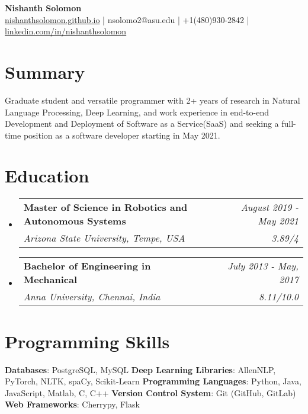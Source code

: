 \documentclass[letterpaper,11pt]{article}
\makeatletter
\newcommand{\resumeSubheading}[4]{
  \vspace{-1pt}\item
    \begin{tabular*}{0.97\textwidth}[t]{l@{\extracolsep{\fill}}r}
      \textbf{#1} & #2 \\
      \textit{\small#3} & \textit{\small #4} \\
    \end{tabular*}\vspace{-5pt}
}
\newcommand{\resumeSubHeadingListStart}{\begin{itemize}[leftmargin=*]}
\newcommand{\resumeSubHeadingListEnd}{\end{itemize}}
\makeatother
\begin{document}
\begin{center}{\textwidth}{{\extracolsep{\fill}}}
  \textbf{{\huge Nishanth Solomon}}\\
  \href{nishanthsolomon.github.io}{nishanthsolomon.github.io} | {nsolomo2@asu.edu} | {+1(480)930-2842} | \href{https://linkedin.com/in/nishanthsolomon/}{linkedin.com/in/nishanthsolomon}
\end{center}




\section{Summary}
{Graduate student and versatile programmer with 2+ years of research in Natural Language Processing, Deep Learning, and work experience in end-to-end Development and Deployment of Software as a Service(SaaS) and seeking a full-time position as a software developer starting in May 2021.}
\section{Education}
  \resumeSubHeadingListStart
    \resumeSubheading
      {Master of Science in Robotics and Autonomous Systems}{\textit{August 2019 - May 2021}}
      {Arizona State University, Tempe, USA}{3.89/4}
    \resumeSubheading
      {Bachelor of Engineering in Mechanical}{\textit{July 2013 - May, 2017}}
      {Anna University, Chennai, India}{8.11/10.0}
  \resumeSubHeadingListEnd

\section{Programming Skills}
 \resumeSubHeadingListStart
   {
     \textbf{Databases}{: PostgreSQL, MySQL}
     \newline
     \textbf{Deep Learning Libraries}{: AllenNLP, PyTorch, NLTK, spaCy, Scikit-Learn}
     \newline
     \textbf{Programming Languages}{: Python, Java, JavaScript, Matlab, C, C++}
     \newline
     \textbf{Version Control System}{: Git (GitHub, GitLab)}
     \newline
     \textbf{Web Frameworks}{: Cherrypy, Flask}
   }
 \resumeSubHeadingListEnd
 
\end{document}
